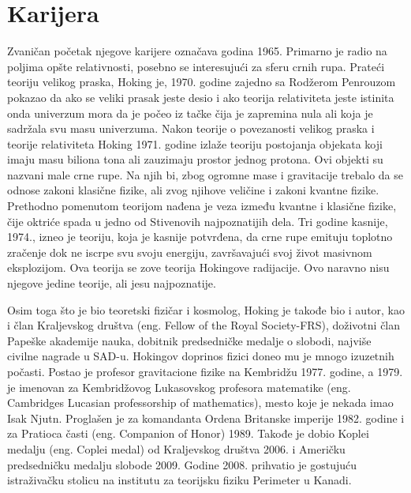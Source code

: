 \documentclass[a4paper, 12pt]{article}
\begin{document}
{\section{Karijera}
Zvaničan početak njegove karijere označava godina 1965. Primarno je radio na poljima opšte 
relativnosti, posebno se interesujući za sferu crnih rupa. Prateći teoriju velikog 
praska, Hoking je, 1970. godine zajedno sa Rodžerom Penrouzom pokazao da ako se veliki 
prasak jeste desio i ako teorija relativiteta jeste istinita onda univerzum mora da je 
počeo iz tačke čija je zapremina nula ali koja je sadržala svu masu univerzuma. \cite{famousscientists}
Nakon teorije o povezanosti velikog praska i teorije relativiteta Hoking 
1971. godine izlaže teoriju postojanja objekata koji imaju masu biliona 
tona ali zauzimaju prostor jednog protona. Ovi objekti su nazvani male crne rupe. 
Na njih bi, zbog ogromne mase i gravitacije trebalo da se odnose zakoni klasične fizike, 
ali zvog njihove veličine i zakoni kvantne fizike. Prethodno pomenutom teorijom nađena je 
veza između kvantne i klasične fizike, čije oktriće spada u jedno od Stivenovih 
najpoznatijih dela. Tri godine kasnije, 1974., izneo je teoriju, koja je kasnije 
potvrđena, da crne rupe emituju toplotno zračenje dok ne iscrpe svu svoju energiju, 
završavajući svoj život masivnom eksplozijom. Ova teorija se zove teorija Hokingove radijacije. 
Ovo naravno nisu njegove jedine teorije, ali jesu najpoznatije. \medskip \cite{britishphysicists}

Osim toga što je bio teoretski fizičar i kosmolog, Hoking je takođe bio i autor, 
kao i član Kraljevskog društva (eng. Fellow of the Royal Society-FRS), doživotni član Papeške akademije nauka, dobitnik 
predsedničke medalje o slobodi, najviše civilne nagrade u SAD-u. Hokingov doprinos 
fizici doneo mu je mnogo izuzetnih počasti. Postao je profesor gravitacione fizike na 
Kembridžu 1977. godine, a 1979. je imenovan za Kembridžovog Lukasovskog profesora 
matematike (eng. Cambridges Lucasian professorship of mathematics), mesto koje je 
nekada imao Isak Njutn. Proglašen je za komandanta Ordena Britanske imperije 1982. 
godine i za Pratioca časti (eng. Companion of Honor) 1989. Takođe je dobio Koplei 
medalju (eng. Coplei medal) od Kraljevskog društva 2006. i Američku predsedničku 
medalju slobode 2009. Godine 2008. prihvatio je gostujuću istraživačku stolicu na 
institutu za teorijsku fiziku Perimeter u Kanadi. \cite{britishphysicists}

}
\end{document}

